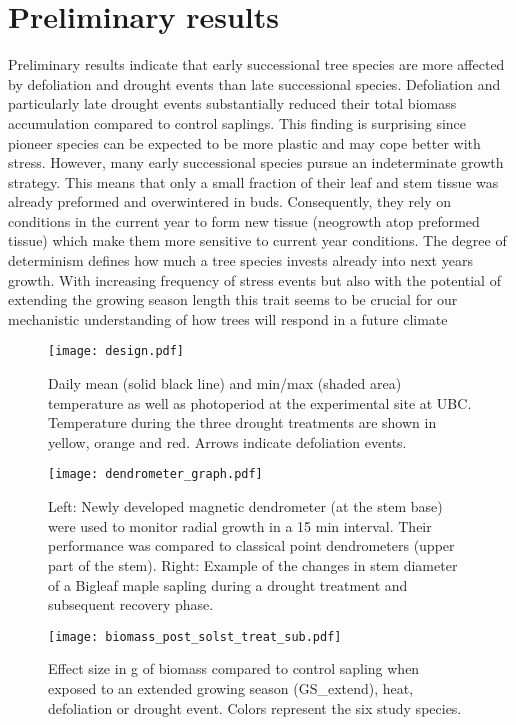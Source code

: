\documentclass{article}
\begin{document}
	
	\section*{Preliminary results}
	
	Preliminary results indicate that early successional tree species are more affected by defoliation and drought events than late successional species. Defoliation and particularly late drought events substantially reduced their total biomass accumulation compared to control saplings. This finding is surprising since pioneer species can be expected to be more plastic and may cope better with stress. However, many early successional species pursue an indeterminate growth strategy. This means that only a small fraction of their leaf and stem tissue was already preformed and overwintered in buds. Consequently, they rely on conditions in the current year to form new tissue (neogrowth atop preformed tissue) which make them more sensitive to current year conditions. The degree of determinism defines how much a tree species invests already into next years growth. With increasing frequency of stress events but also with the potential of extending the growing season length this trait seems to be crucial for our mechanistic understanding of how trees will respond in a future climate
	
		\begin{figure}[H]
		\centering
		\texttt{[image: design.pdf]} 
		\caption{Daily mean (solid black line) and min/max (shaded area) temperature as well as photoperiod at the experimental site at UBC. Temperature during the three drought treatments are shown in yellow, orange and red. Arrows indicate defoliation events.}
		\label{fig:fig_1xxx}
	\end{figure}
	
			\begin{figure}[H]
		\centering
		\texttt{[image: dendrometer\_graph.pdf]} 
		\caption{Left: Newly developed magnetic dendrometer (at the stem base) were used to monitor radial growth in a 15 min interval. Their performance was compared to classical point dendrometers (upper part of the stem). Right: Example of the changes in stem diameter of a Bigleaf maple sapling during a drought treatment and subsequent recovery phase.}
		\label{fig:fig_1xxx}
	\end{figure}
	
	
	\begin{figure}[H]
	\centering
	\texttt{[image: biomass\_post\_solst\_treat\_sub.pdf]} 
	\caption{Effect size in g of biomass compared to control sapling when exposed to an extended growing season (GS\_extend), heat, defoliation or drought event. Colors represent the six study species.}
	\label{fig:fig_1xxx}
\end{figure}
	
\end{document}
